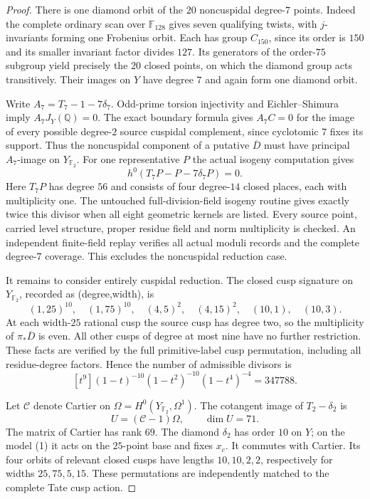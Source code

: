 \begin{proof}
There is one diamond orbit of the $20$ noncuspidal degree-$7$ points.
Indeed the complete ordinary scan over $\mathbb F_{128}$ gives seven
qualifying twists, with $j$-invariants forming one Frobenius orbit.
Each has group $C_{150}$, since its order is $150$ and its smaller
invariant factor divides $127$. Its generators of the order-$75$
subgroup yield precisely the $20$ closed points, on which the diamond
group acts transitively. Their images on $Y$ have degree $7$ and
again form one diamond orbit.

Write $A_7=T_7-1-7\delta_7$. Odd-prime torsion injectivity and
Eichler--Shimura imply $A_7J_Y(\mathbb Q)=0$. The exact boundary
formula gives $A_7C=0$ for the image of every possible degree-$2$
source cuspidal complement, since cyclotomic $7$ fixes its support.
Thus the noncuspidal component of a putative $\overline D$ must have
principal $A_7$-image on $Y_{\mathbb F_2}$. For one representative
$P$ the actual isogeny computation gives
\[
 h^0(T_7P-P-7\delta_7P)=0.
\]
Here $T_7P$ has degree $56$ and consists of four degree-$14$ closed
places, each with multiplicity one. The untouched full-division-field
isogeny routine gives exactly twice this divisor when all eight
geometric kernels are listed. Every source point, carried level
structure, proper residue field and norm multiplicity is checked.
An independent finite-field replay verifies all actual moduli records
and the complete degree-$7$ coverage. This excludes the noncuspidal
reduction case.

It remains to consider entirely cuspidal reduction. The closed cusp
signature on $Y_{\mathbb F_2}$, recorded as (degree,width), is
\[
 (1,25)^{10},\quad(1,75)^{10},\quad
 (4,5)^2,\quad(4,15)^2,\quad(10,1),\quad(10,3).
\]
At each width-$25$ rational cusp the source cusp has degree two,
so the multiplicity of $\pi_*\overline D$ is even. All other cusps
of degree at most nine have no further restriction. These facts
are verified by the full primitive-label cusp permutation, including
all residue-degree factors. Hence the number of admissible divisors is
\[
 [t^9](1-t)^{-10}(1-t^2)^{-10}(1-t^4)^{-4}=347788.
\]

Let $\mathcal C$ denote Cartier on
$\Omega=H^0(Y_{\mathbb F_2},\Omega^1)$. The cotangent image of
$T_2-\delta_2$ is
\[
 U=(\mathcal C-1)\Omega,\qquad \dim U=71.
\]
The matrix of Cartier has rank $69$. The diamond $\delta_2$ has order
$10$ on $Y$; on the model (1) it acts on the $25$-point base and fixes
$x_c$. It commutes with Cartier. Its four orbits of relevant closed
cusps have lengths $10,10,2,2$, respectively for widths $25,75,5,15$.
These permutations are independently matched to the complete Tate
cusp action.


\end{proof}
